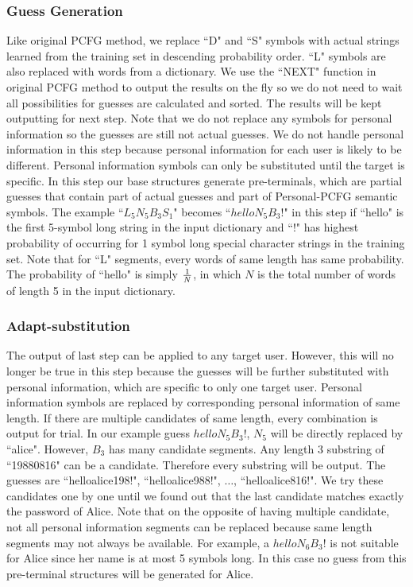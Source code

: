\subsubsection{Guess Generation}
Like original PCFG method, we replace ``D" and ``S" symbols with actual strings learned from the training set in descending probability order. ``L" symbols are also replaced with words from a dictionary. We use the ``NEXT" function \cite{weir2009password} in original PCFG method to output the results on the fly so we do not need to wait all possibilities for guesses are calculated and sorted. The results will be kept outputting for next step. Note that we do not replace any symbols for personal information so the guesses are still not actual guesses. We do not handle personal information in this step because personal information for each user is likely to be different. Personal information symbols can only be substituted until the target is specific. In this step our base structures generate pre-terminals, which are partial guesses that contain part of actual guesses and part of Personal-PCFG semantic symbols. The example ``$L_5N_5B_3S_1$" becomes ``$helloN_5B_3!$" in this step if ``hello" is the first 5-symbol long string in the input dictionary and ``!" has highest probability of occurring for 1 symbol long special character strings in the training set. Note that for ``L" segments, every words of same length has same probability. The probability of ``hello" is simply $1\over N$, in which $N$ is the total number of words of length 5 in the input dictionary. 

\subsubsection{Adapt-substitution}
The output of last step can be applied to any target user. However, this will no longer be true in this step because the guesses will be further substituted with personal information, which are specific to only one target user. Personal information symbols are replaced by corresponding personal information of same length. If there are multiple candidates of same length, every combination is output for trial. In our example guess $helloN_5B_3!$, $N_5$ will be directly replaced by ``alice". However, $B_3$ has many candidate segments. Any length 3 substring of ``19880816" can be a candidate. Therefore every substring will be output. The guesses are ``helloalice198!", ``helloalice988!", $\ldots$, ``helloalice816!". We try these candidates one by one until we found out that the last candidate matches exactly the password of Alice. Note that on the opposite of having multiple candidate, not all personal information segments can be replaced because same length segments may not always be available. For example, a $helloN_6B_3!$ is not suitable for Alice since her name is at most 5 symbols long. In this case no guess from this pre-terminal structures will be generated for Alice. 

